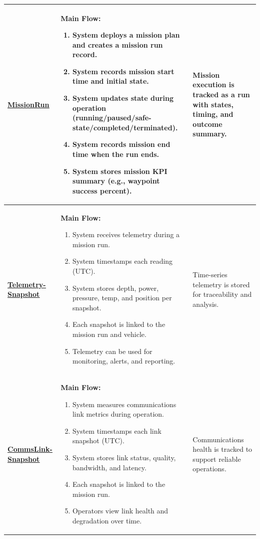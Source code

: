 \documentclass[11pt,a4paper]{article}
\let\orighyperref\hyperref
\renewcommand{\hyperref}[2][]{\orighyperref[#1]{\uline{#2}}}%
\begin{document}
\begin{longtable}{|>{\raggedright\arraybackslash}p{}|>{\raggedright\arraybackslash}p{}|>{\raggedright\arraybackslash}p{}|}
\textbf{\hyperref[tab:data-dictionary-missionrun]{MissionRun}}\label{flow-MissionRun} &
\textbf{Main Flow:}\begin{enumerate}[leftmargin=*,nosep]
  \item System deploys a mission plan and creates a mission run record.
  \item System records mission start time and initial state.
  \item System updates state during operation (running/paused/safe-state/completed/terminated).
  \item System records mission end time when the run ends.
  \item System stores mission KPI summary (e.g., waypoint success percent).
\end{enumerate} &
Mission execution is tracked as a run with states, timing, and outcome summary. \\
\hline

\textbf{\hyperref[tab:data-dictionary-telemetrysnapshot]{Telemetry-\allowbreak Snapshot}}\label{flow-TelemetrySnapshot} &
\textbf{Main Flow:}\begin{enumerate}[leftmargin=*,nosep]
  \item System receives telemetry during a mission run.
  \item System timestamps each reading (UTC).
  \item System stores depth, power, pressure, temp, and position per snapshot.
  \item Each snapshot is linked to the mission run and vehicle.
  \item Telemetry can be used for monitoring, alerts, and reporting.
\end{enumerate} &
Time-series telemetry is stored for traceability and analysis. \\
\hline

\textbf{\hyperref[tab:data-dictionary-commslinksnapshot]{CommsLink-\allowbreak Snapshot}}\label{flow-CommsLinkSnapshot} &
\textbf{Main Flow:}\begin{enumerate}[leftmargin=*,nosep]
  \item System measures communications link metrics during operation.
  \item System timestamps each link snapshot (UTC).
  \item System stores link status, quality, bandwidth, and latency.
  \item Each snapshot is linked to the mission run.
  \item Operators view link health and degradation over time.
\end{enumerate} &
Communications health is tracked to support reliable operations. \\
\hline


\end{longtable}
\end{document}
